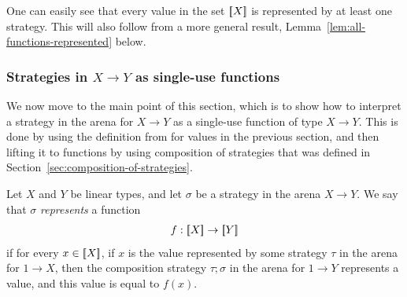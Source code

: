 \documentclass[10pt,a4paper]{amsart}
\numberwithin{equation}{section}
\theoremstyle{plain}
\newcommand{\sem}[1]{[{\kern-0.45ex}[#1]{\kern-0.45ex}]}
\begin{document}
One can easily see that every value in the set $\sem X$ is represented by at least one strategy. This will also follow from a more general result, Lemma~\ref{lem:all-functions-represented} below.

\subsubsection{Strategies in $X \to Y$ as single-use functions}
We now move to the main point of this section, which is to show how to interpret a strategy in the arena for $X \to Y$ as a single-use function of type $X \to Y$. This is done by using the definition from for values in the previous section, and then lifting it to functions by using composition of strategies that was defined in Section~\ref{sec:composition-of-strategies}.


\begin{definition}\label{def:strategy-as-single-use-function}
    Let $X$ and $Y$ be linear types, and let $\sigma$ be a strategy in the arena $X \to Y$. We say that $\sigma$ \emph{represents} a function  
    \begin{align*}
    f : \sem{X} \to \sem{Y}
    \end{align*}
    if for every $x \in \sem X$, if  $x$ is the value  represented by some strategy $\tau$ in the arena for $1 \to X$, then the composition strategy $\tau;\sigma$ in the arena for $1 \to Y$ represents a value, and this value is equal to $f(x)$.
\end{definition}
\end{document}
